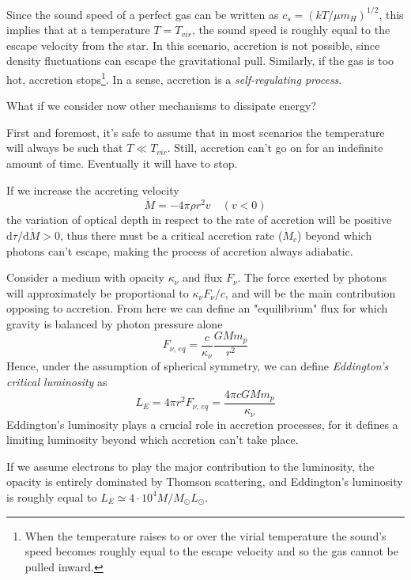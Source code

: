 Since the sound speed of a perfect gas can be written as $c_{s} = (kT/\mu m_{H})^{1/2}$, this implies that at a temperature $T = T_{vir}$, the sound speed is roughly equal to the escape velocity from the star. In this scenario, accretion is not possible, since density fluctuations can escape the gravitational pull. Similarly, if the gas is too hot, accretion stops\footnote{When the temperature raises to or over the virial temperature the sound's speed becomes roughly equal to the escape velocity and so the gas cannot be pulled inward.}. In a sense, accretion is a \emph{self-regulating process}.
\par What if we consider now other mechanisms to dissipate energy?
\par First and foremost, it's safe to assume that in most scenarios the temperature will always be such that $T\ll T_{vir}$. Still, accretion can't go on for an indefinite amount of time. Eventually it will have to stop.
\par If we increase the accreting velocity
\begin{equation*}
    \dot{M} = -4\pi\rho r^{2} v \quad (v<0)
\end{equation*}
the variation of optical depth in respect to the rate of accretion will be positive $\text{d}\tau/\text{d}\dot{M} > 0$, thus there must be a critical accretion rate ($\dot{M}_{c}$) beyond which photons can't escape, making the process of accretion always adiabatic.
\par Consider a medium with opacity $\kappa_{\nu}$ and flux $F_{\nu}$. The force exerted by photons will approximately be proportional to $\kappa_{\nu}F_{\nu}/c$, and will be the main contribution opposing to accretion. From here we can define an "equilibrium" flux for which gravity is balanced by photon pressure alone
\begin{equation*}
    F_{\nu, \,eq} = \frac{c}{\kappa_{\nu}}\frac{GMm_{p}}{r^{2}}
\end{equation*}
Hence, under the assumption of spherical symmetry, we can define \emph{Eddington's critical luminosity} as 
\begin{equation}
    L_{E} = 4\pi r^{2}F_{\nu, \,eq} = \frac{4\pi c GMm_{p}}{\kappa_{\nu}}
    \label{eq:eddingon_lum}
\end{equation}
Eddington's luminosity plays a crucial role in accretion processes, for it defines a limiting luminosity beyond which accretion can't take place.
\par If we assume electrons to play the major contribution to the luminosity, the opacity is entirely dominated by Thomson scattering, and Eddington's luminosity is roughly equal to $L_{E} \simeq 4\cdot10^{4} M/M_{\odot} L_{\odot}$.
